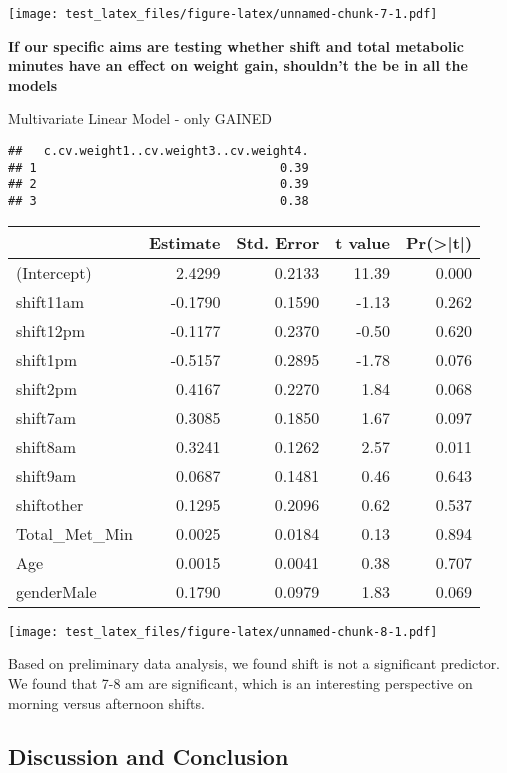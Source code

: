 \documentclass[]{article}
\begin{document}
\texttt{[image: test\_latex\_files/figure-latex/unnamed-chunk-7-1.pdf]}

\textbf{If our specific aims are testing whether shift and total
metabolic minutes have an effect on weight gain, shouldn't the be in all
the models}

Multivariate Linear Model - only GAINED

\begin{verbatim}
##   c.cv.weight1..cv.weight3..cv.weight4.
## 1                                  0.39
## 2                                  0.39
## 3                                  0.38
\end{verbatim}

\begin{tabular}{l|r|r|r|r}
\hline
  & Estimate & Std. Error & t value & Pr(>|t|)\\
\hline
(Intercept) & 2.4299 & 0.2133 & 11.39 & 0.000\\
\hline
shift11am & -0.1790 & 0.1590 & -1.13 & 0.262\\
\hline
shift12pm & -0.1177 & 0.2370 & -0.50 & 0.620\\
\hline
shift1pm & -0.5157 & 0.2895 & -1.78 & 0.076\\
\hline
shift2pm & 0.4167 & 0.2270 & 1.84 & 0.068\\
\hline
shift7am & 0.3085 & 0.1850 & 1.67 & 0.097\\
\hline
shift8am & 0.3241 & 0.1262 & 2.57 & 0.011\\
\hline
shift9am & 0.0687 & 0.1481 & 0.46 & 0.643\\
\hline
shiftother & 0.1295 & 0.2096 & 0.62 & 0.537\\
\hline
Total\_Met\_Min & 0.0025 & 0.0184 & 0.13 & 0.894\\
\hline
Age & 0.0015 & 0.0041 & 0.38 & 0.707\\
\hline
genderMale & 0.1790 & 0.0979 & 1.83 & 0.069\\
\hline
\end{tabular}

\texttt{[image: test\_latex\_files/figure-latex/unnamed-chunk-8-1.pdf]}

Based on preliminary data analysis, we found shift is not a significant
predictor. We found that 7-8 am are significant, which is an interesting
perspective on morning versus afternoon shifts.

\hypertarget{discussion-and-conclusion}{%
\subsection{Discussion and Conclusion}\label{discussion-and-conclusion}}
\end{document}
